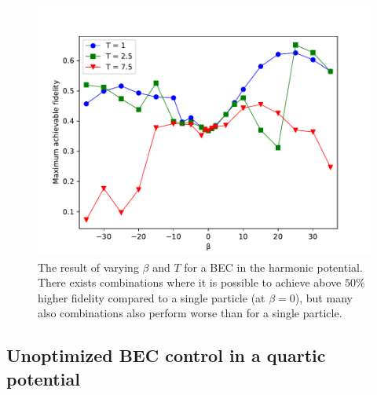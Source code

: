\documentclass[a4paper, twocolumn]{revtex4-1}
\begin{document}
\begin{figure}[h]
	\includegraphics[width=\columnwidth]{graphics/exploration/betaTHO.pdf}
	\caption{The result of varying $\beta$ and $T$ for a BEC in the harmonic potential. There exists combinations where it is possible to achieve above $50\%$ higher fidelity compared to a single particle (at $\beta=0$), but many also combinations also perform worse than for a single particle.}
	\label{fig:HO}
\end{figure}

\subsection{Unoptimized BEC control in a quartic potential}
\end{document}
